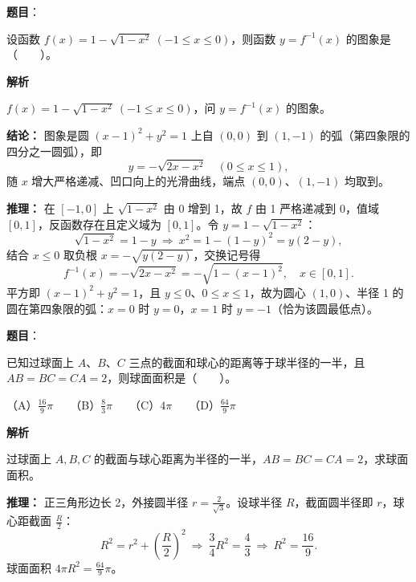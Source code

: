\begin{answer}

\textbf{题目}：

设函数 $f(x)=1-\sqrt{1-x^2}\ (-1\le x\le0)$，则函数 $y=f^{-1}(x)$ 的图象是\mbox{（　　）}。
\nopagebreak[4]
\begin{center}\end{center}
\nopagebreak[4]
\textbf{解析}

$f(x)=1-\sqrt{1-x^2}\ (-1\le x\le0)$，问 $y=f^{-1}(x)$ 的图象。

\textbf{结论：} 图象是圆 $(x-1)^2+y^2=1$ 上自 $(0,0)$ 到 $(1,-1)$ 的弧（第四象限的四分之一圆弧），即
\nopagebreak[4]
\[y=-\sqrt{2x-x^2}\quad(0\le x\le1),\]
随 $x$ 增大严格递减、凹口向上的光滑曲线，端点 $(0,0)$、$(1,-1)$ 均取到。

\textbf{推理：} 在 $[-1,0]$ 上 $\sqrt{1-x^2}$ 由 0 增到 1，故 $f$ 由 1 严格递减到 0，值域 $[0,1]$，反函数存在且定义域为 $[0,1]$。令 $y=1-\sqrt{1-x^2}$：
\nopagebreak[4]
\[\sqrt{1-x^2}=1-y\ \Rightarrow\ x^2=1-(1-y)^2=y(2-y),\]
结合 $x\le0$ 取负根 $x=-\sqrt{y(2-y)}$，交换记号得
\nopagebreak[4]
\[f^{-1}(x)=-\sqrt{2x-x^2}=-\sqrt{1-(x-1)^2},\quad x\in[0,1].\]
平方即 $(x-1)^2+y^2=1$，且 $y\le0$、$0\le x\le1$，故为圆心 $(1,0)$、半径 1 的圆在第四象限的弧：$x=0$ 时 $y=0$，$x=1$ 时 $y=-1$（恰为该圆最低点）。


\end{answer}
\begin{answer}

\textbf{题目}：

已知过球面上 $A\text{、}B\text{、}C$ 三点的截面和球心的距离等于球半径的一半，且 $AB=BC=CA=2$，则球面面积是\mbox{（　　）}。

（A）$\frac{16}{9}\pi$　　（B）$\frac83\pi$　　（C）$4\pi$　　（D）$\frac{64}{9}\pi$

\textbf{解析}

过球面上 $A,B,C$ 的截面与球心距离为半径的一半，$AB=BC=CA=2$，求球面面积。

\textbf{推理：} 正三角形边长 2，外接圆半径 $r=\frac{2}{\sqrt3}$。设球半径 $R$，截面圆半径即 $r$，球心距截面 $\frac R2$：
\nopagebreak[4]
\[R^2=r^2+\left(\frac R2\right)^2\ \Rightarrow\ \frac34R^2=\frac43\ \Rightarrow\ R^2=\frac{16}9.\]
球面面积 $4\pi R^2=\frac{64}9\pi$。


\end{answer}
